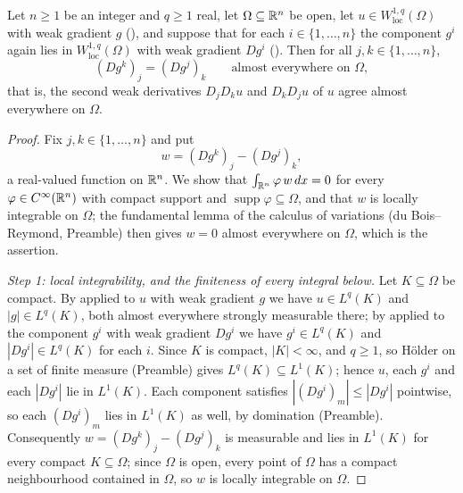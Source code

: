 \begin{lemma}
Let $n\ge1$ be an integer and $q\ge1$ real, let $\Omega\subseteq\mathbb{R}^n$ be open,
let $u\in W^{1,q}_{\mathrm{loc}}(\Omega)$ with weak gradient $g$
(), and suppose that for each $i\in\{1,\dots,n\}$ the
component $g^i$ again lies in $W^{1,q}_{\mathrm{loc}}(\Omega)$ with weak
gradient $Dg^i$ ().  Then for all
$j,k\in\{1,\dots,n\}$,
\[
(Dg^k)_j=(Dg^j)_k\qquad\text{almost everywhere on }\Omega ,
\]
that is, the second weak derivatives $D_jD_ku$ and $D_kD_ju$ of $u$ agree almost
everywhere on $\Omega$.
\end{lemma}
\begin{proof}
Fix $j,k\in\{1,\dots,n\}$ and put
\[
w=(Dg^k)_j-(Dg^j)_k ,
\]
a real-valued function on $\mathbb{R}^n$.  We show that $\int_{\mathbb{R}^n}\varphi\,w\,dx=0$
for every $\varphi\in C^\infty(\mathbb{R}^n)$ with compact support and
$\operatorname{supp}\varphi\subseteq\Omega$, and that $w$ is locally integrable
on $\Omega$; the fundamental lemma of the calculus of variations (du
Bois--Reymond, Preamble) then gives $w=0$ almost everywhere on $\Omega$, which
is the assertion.

\emph{Step 1: local integrability, and the finiteness of every integral below.}
Let $K\subseteq\Omega$ be compact.  By  applied to $u$ with
weak gradient $g$ we have $u\in L^q(K)$ and $|g|\in L^q(K)$, both almost
everywhere strongly measurable there; by  applied to the
component $g^i$ with weak gradient $Dg^i$ we have $g^i\in L^q(K)$ and
$|Dg^i|\in L^q(K)$ for each $i$.  Since $K$ is compact, $|K|<\infty$, and
$q\ge1$, so H\"older on a set of finite measure (Preamble) gives
$L^q(K)\subseteq L^1(K)$; hence $u$, each $g^i$ and each $|Dg^i|$ lie in
$L^1(K)$.  Each component satisfies $|(Dg^i)_m|\le|Dg^i|$ pointwise, so each
$(Dg^i)_m$ lies in $L^1(K)$ as well, by domination (Preamble).  Consequently
$w=(Dg^k)_j-(Dg^j)_k$ is measurable and lies in $L^1(K)$ for every compact
$K\subseteq\Omega$; since $\Omega$ is open, every point of $\Omega$ has a
compact neighbourhood contained in $\Omega$, so $w$ is locally integrable on
$\Omega$.


\end{proof}
